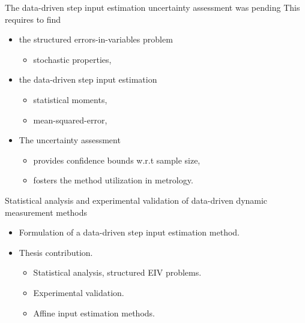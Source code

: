 \documentclass[presentation]{beamer}
\begin{document}
\begin{frame}[label={slide:need}]{The data-driven step input estimation \linebreak uncertainty assessment was pending}
This requires to find 
\begin{itemize}
	\item the structured errors-in-variables problem 
	\begin{itemize}
		\item stochastic properties,
	\end{itemize}
	\item the data-driven step input estimation 
	\begin{itemize}
		\item statistical moments, 
		\item mean-squared-error,  
	\end{itemize}
\end{itemize}
\vspace{5mm}
\begin{itemize}
	\color{blue}
	\item The uncertainty assessment
	\begin{itemize}
		\color{blue}
		\item provides confidence bounds w.r.t sample size,
		\item fosters the method utilization in metrology.
	\end{itemize}
\end{itemize}
\end{frame}

\begin{frame}[label={slides:preview}]{Statistical analysis and experimental validation \linebreak of data-driven dynamic measurement methods}
\begin{itemize}
	\color{gray}
	\item Formulation of a data-driven step input estimation method.
	\vspace{0.5cm}
	\color{black}
	\item Thesis contribution.
	\begin{itemize}
 		\item Statistical analysis, structured EIV problems.
		\color{gray}
		\item Experimental validation.
		\item Affine input estimation methods.
 	\end{itemize}
\end{itemize}
\color{black}
\end{frame}
\end{document}
